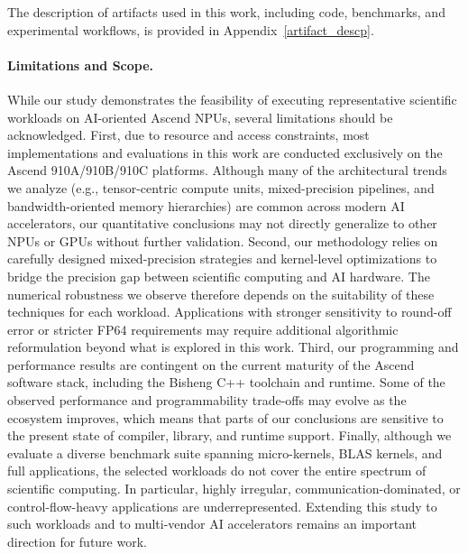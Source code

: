 \documentclass{article}
\begin{document}
The description of artifacts used in this work, including code, benchmarks, and experimental workflows, is provided in Appendix~\ref{artifact_descp}.

\paragraph{Limitations and Scope.}
While our study demonstrates the feasibility of executing representative scientific workloads on AI-oriented Ascend NPUs, several limitations should be acknowledged. First, due to resource and access constraints, most implementations and evaluations in this work are conducted exclusively on the Ascend 910A/910B/910C platforms. 
Although many of the architectural trends we analyze (e.g., tensor-centric compute units, mixed-precision pipelines, and bandwidth-oriented memory hierarchies) are common across modern AI accelerators, our quantitative conclusions may not directly generalize to other NPUs or GPUs without further validation. Second, our methodology relies on carefully designed mixed-precision strategies and kernel-level optimizations to bridge the precision gap between scientific computing and AI hardware. 
The numerical robustness we observe therefore depends on the suitability of these techniques for each workload. 
Applications with stronger sensitivity to round-off error or stricter FP64 requirements may require additional algorithmic reformulation beyond what is explored in this work. Third, our programming and performance results are contingent on the current maturity of the Ascend software stack, including the Bisheng C++ toolchain and runtime. 
Some of the observed performance and programmability trade-offs may evolve as the ecosystem improves, which means that parts of our conclusions are sensitive to the present state of compiler, library, and runtime support. Finally, although we evaluate a diverse benchmark suite spanning micro-kernels, BLAS kernels, and full applications, the selected workloads do not cover the entire spectrum of scientific computing. 
In particular, highly irregular, communication-dominated, or control-flow-heavy applications are underrepresented. 
Extending this study to such workloads and to multi-vendor AI accelerators remains an important direction for future work.

\end{document}
